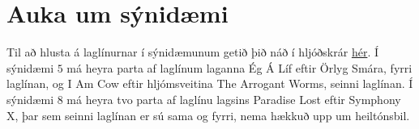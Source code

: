 \section*{Auka um sýnidæmi}
Til að hlusta á laglínurnar í sýnidæmunum getið þið náð í hljóðskrár \href{/problems/iceland.logumlog/file/statement/attachments/melodies.zip}{hér}.
Í sýnidæmi $5$ má heyra parta af laglínum laganna Ég Á Líf eftir Örlyg Smára, fyrri laglínan, og I Am Cow eftir hljómsveitina The Arrogant Worms, seinni laglínan.
Í sýnidæmi $8$ má heyra tvo parta af laglínu lagsins Paradise Lost eftir Symphony X, þar sem seinni laglínan er sú sama og fyrri, nema hækkuð upp um heiltónsbil.
